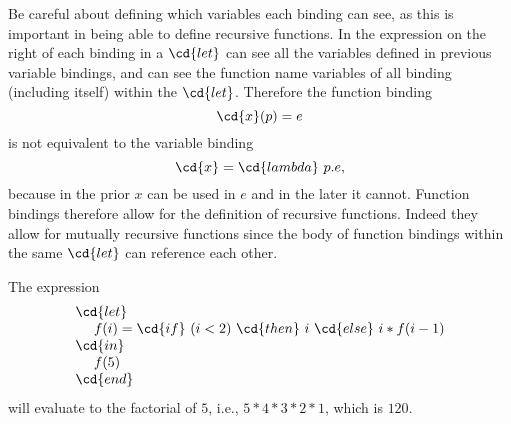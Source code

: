 \begin{cluster}
\label{grp:nt:sparc::careful}

\begin{note}
\label{nt:sparc::careful}
Be careful about defining which variables each binding can see, as
this is important in being able to define recursive functions.  In
\pml{} the expression on the right of each binding in a $\cd{let}$ can
see all the variables defined in previous variable bindings, and can
see the function name variables of all binding (including itself)
within the $\cd{let}$.
Therefore the function binding
\[
\cd{x}(p) = e
\]
is not equivalent to the variable binding
\[
\cd{x} = \cd{lambda}~p.e,
\]
because in the prior $x$ can be used
in $e$ and in the later it cannot.
Function bindings therefore allow for the definition of
recursive functions.  
Indeed they allow for mutually recursive functions since the body of
function bindings within the same $\cd{let}$ can reference each other.

\end{note}
\end{cluster}

\begin{cluster}
\label{grp:xmpl:sparc::else}

\begin{example}
\label{xmpl:sparc::else}
The expression
\[
\begin{array}{l}
\cd{let}\\
~~~~f(i) = \cd{if} ~(i < 2) ~\cd{then}~ i ~\cd{else}~ i  * 
f(i - 1) \\
\cd{in} \\ 
~~~~f(5) \\
\cd{end} 
\end{array}
\]
will evaluate to the factorial of $5$, i.e., $5 * 4 * 3 * 2
* 1$, which is $120$.

\end{example}
\end{cluster}

